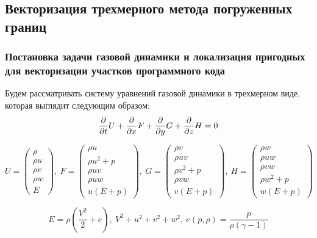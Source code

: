 \subsection{Векторизация трехмерного метода погруженных границ}

\subsubsection{Постановка задачи газовой динамики и локализация пригодных для векторизации участков программного кода}

Будем рассматривать систему уравнений газовой динамики в трехмерном виде, которая выглядит следующим образом:
\begin{equation}
	\frac{\partial}{\partial t} U + \frac{\partial}{\partial x} F + \frac{\partial}{\partial y} G + \frac{\partial}{\partial z} H = 0 \\
\end{equation}

\begin{equation}
U = \begin{pmatrix}
	\rho \\
	\rho u \\
	\rho v \\
	\rho w \\
	E
\end{pmatrix}, \
F = \begin{pmatrix}
	\rho u \\
	\rho u^2 + p \\
	\rho u v \\
	\rho u w \\
	u (E + p)
\end{pmatrix}, \
G = \begin{pmatrix}
	\rho v \\
	\rho u v \\
	\rho v^2 + p \\
	\rho v w \\
	v (E + p)
\end{pmatrix}, \
H = \begin{pmatrix}
	\rho w \\
	\rho u w \\
	\rho v w \\
	\rho w^2 + p \\
	w (E + p)
\end{pmatrix}
\end{equation}

\begin{equation}
	E = \rho \left( \frac{V^2}{2} + e \right), \ V^2 + u^2 + v^2 + w^2, \ e(p, \rho) = \frac{p}{\rho (\gamma - 1)}
\end{equation}

